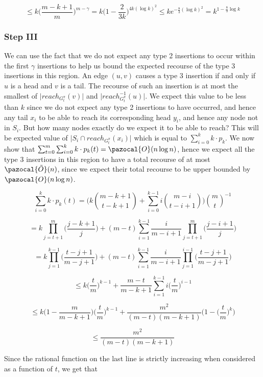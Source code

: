 \documentclass{article}
\begin{document}
\[ \leq k \bigg(\frac{m-k+1}{m}\bigg)^{m-\gamma} = k\bigg(1 - \frac{2}{3k}\bigg)^{4k (\log k)^2} \leq ke^{-\frac{8}{3}(\log k)^2} = k^{1-\frac{8}{3}\log k}\]

\subsubsection{Step III}

We can use the fact that we do not expect any type 2 insertions to occur within the first $\gamma$ insertions to help us bound the expected recourse of the type 3 insertions in this region. An edge $(u,v)$ causes a type 3 insertion if and only if $u$ is a head and $v$ is a tail. The recourse of such an insertion is at most the smallest of $\vert reach_{G_{t}^{\pi}}(v)\vert$ and $\vert reach^{-1}_{G_{t}^{\pi}}(u)\vert$. We expect this value to be less than $k$ since we do not expect any type 2 insertions to have occurred, and hence any tail $x_{i}$ to be able to reach its corresponding head $y_{i}$, and hence any node not in $S_{i}$. But how many nodes exactly do we expect it to be able to reach? This will be expected value of $\vert S_{i} \cap reach_{G_{t}^{\pi}}(x_{i})\vert$ which is equal to $\sum_{i=0}^{k}k \cdot p_{k}$. We now show that $\sum_{t=0}^{m} \sum_{i=0}^{k}k \cdot p_{k}(t) = \pazocal{O}(n \log n)$, hence we expect all the type 3 insertions in this region to have a total recourse of at most $\pazocal{\tilde{O}}(n)$, since we expect their total recourse to be upper bounded by $\pazocal{O}(n \log n)$.

\[\sum_{i=0}^{k}k \cdot p_{k}(t) = \Bigg(k\binom{m-k+1}{t-k+1} + \sum_{i=0}^{k-1}i\binom{m-i}{t-i+1} \Bigg)\binom{m}{t}^{-1} \]

\[ = k\prod_{j=t+1}^{m}\bigg(\frac{j-k+1}{j}\bigg) + (m-t)\sum_{i=1}^{k-1}\frac{i}{m-i+1} \prod_{j=t+1}^{m}\bigg(\frac{j-i+1}{j}\bigg) \]

\[ = k\prod_{j=1}^{k-1}\bigg(\frac{t-j+1}{m-j+1}\bigg) + (m-t)\sum_{i=1}^{k-1}\frac{i}{m-i+1} \prod_{j=1}^{i-1}\bigg(\frac{t-j+1}{m-j+1}\bigg) \]

\[ \leq k\Big( \frac{t}{m} \Big)^{k-1} + \frac{m-t}{m-k+1}\sum_{i=1}^{k-1}i\Big( \frac{t}{m} \Big)^{i-1} \]

\[ \leq k\bigg(1 - \frac{m}{m-k+1} \bigg)\Big( \frac{t}{m} \Big)^{k-1} + \frac{m^2}{(m-t)(m-k+1)} \bigg(1-\Big( \frac{t}{m} \Big)^{k} \bigg) \]

\[ \leq \frac{m^2}{(m-t)(m-k+1)}\]

Since the rational function on the last line is strictly increasing when considered as a function of $t$, we get that
\end{document}

